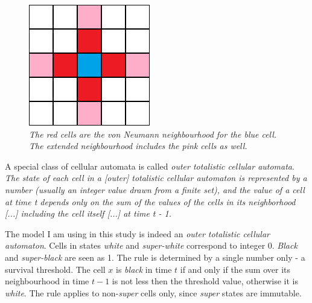 \documentclass[a4paper, 11pt]{article} %
\begin{document}
\begin{figure}[ht]
\begin{minipage}[t]{0.45\textwidth}
		\includegraphics[width=\textwidth]{neumann}
		\caption{\textit{The red cells are the von Neumann neighbourhood for the blue cell. The extended neighbourhood includes the pink cells as well.} \cite{wiki}}
		\label{fig:neumann_neighbourhood}
	\end{minipage}
\end{figure}

A special class of cellular automata is called \emph{outer totalistic cellular automata}. \textit{The state of each cell in a [outer] totalistic cellular automaton is represented by a number (usually an integer value drawn from a finite set), and the value of a cell at time t depends only on the sum of the values of the cells in its neighborhood [...] including the cell itself [...] at time t - 1.} \cite{wiki}

The model I am using in this study is indeed an \emph{outer totalistic cellular automaton}. Cells in states \emph{white} and \emph{super-white} correspond to integer 0. \emph{Black} and \emph{super-black} are seen as 1. The rule is determined by a single number only - a survival threshold. The cell $x$ is \emph{black} in time $t$ if and only if the sum over its neighbourhood in time $t - 1$ is not less then the threshold value, otherwise it is \emph{white}. The rule applies to non-\emph{super} cells only, since \emph{super} states are immutable.
\end{document}
